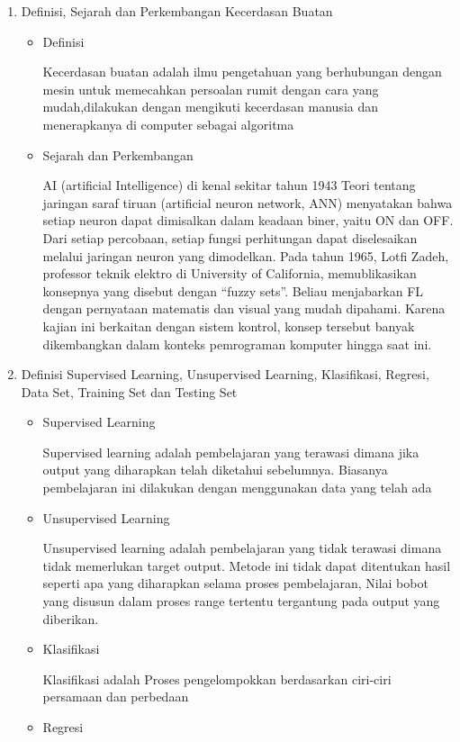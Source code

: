 \begin{enumerate}
\item Definisi, Sejarah dan Perkembangan Kecerdasan Buatan
\begin{itemize}
\item Definisi
\par
Kecerdasan buatan adalah ilmu pengetahuan yang berhubungan dengan mesin untuk memecahkan persoalan rumit dengan cara yang mudah,dilakukan dengan mengikuti kecerdasan manusia dan menerapkanya di computer sebagai algoritma
\par
\item Sejarah dan Perkembangan
\par
AI (artificial Intelligence) di kenal sekitar tahun 1943 Teori tentang jaringan saraf tiruan (artificial neuron network, ANN) menyatakan bahwa setiap neuron dapat dimisalkan dalam keadaan biner, yaitu ON dan OFF. Dari setiap percobaan, setiap fungsi perhitungan dapat diselesaikan melalui jaringan neuron yang dimodelkan.
Pada tahun 1965, Lotfi Zadeh, professor teknik elektro di University of California, memublikasikan konsepnya yang disebut dengan “fuzzy sets”. Beliau menjabarkan FL dengan pernyataan matematis dan visual yang mudah dipahami. Karena kajian ini berkaitan dengan sistem kontrol, konsep tersebut banyak dikembangkan dalam konteks pemrograman komputer hingga saat ini.
\end{itemize}
\item Definisi Supervised Learning, Unsupervised Learning, Klasifikasi, Regresi, Data Set, Training Set dan Testing Set
\begin{itemize}
\item Supervised Learning 
\par
Supervised learning adalah pembelajaran yang terawasi dimana jika output yang diharapkan telah diketahui sebelumnya. Biasanya pembelajaran ini dilakukan dengan menggunakan data yang telah ada
\item Unsupervised Learning
\par
Unsupervised learning adalah pembelajaran yang tidak terawasi dimana tidak memerlukan target output. Metode ini tidak dapat ditentukan hasil seperti apa yang diharapkan selama proses pembelajaran, Nilai bobot yang disusun dalam proses range tertentu tergantung pada output yang diberikan.
\item Klasifikasi
\par
Klasifikasi adalah Proses pengelompokkan berdasarkan ciri-ciri persamaan dan perbedaan
\item Regresi

\end{itemize}
\end{enumerate}
